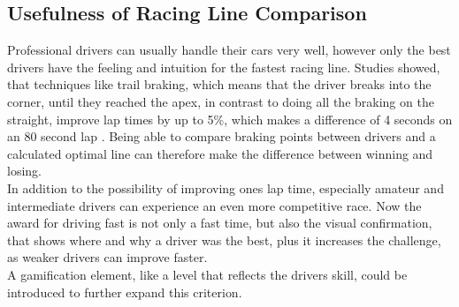 \subsection{Usefulness of Racing Line Comparison}
Professional drivers can usually handle their cars very well, however only the best drivers have the feeling and intuition for the fastest racing line. Studies showed, that techniques like trail braking, which means that the driver breaks into the corner, until they reached the apex, in contrast to doing all the braking on the straight, improve lap times by up to 5\%, which makes a difference of 4 seconds on an 80 second lap \cite{gustafsson08}. Being able to compare braking points between drivers and a calculated optimal line can therefore make the difference between winning and losing.\\
In addition to the possibility of improving ones lap time, especially amateur and intermediate drivers can experience an even more competitive race. Now the award for driving fast is not only a fast time, but also the visual confirmation, that shows where and why a driver was the best, plus it increases the challenge, as weaker drivers can improve faster.\\
A gamification element, like a level that reflects the drivers skill, could be introduced to further expand this criterion.

\clearpage
